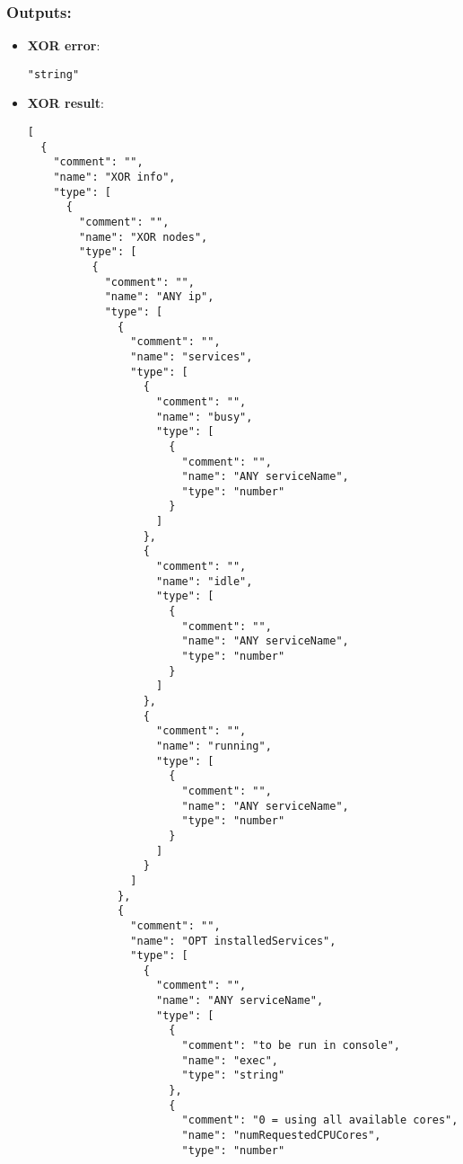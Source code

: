 \subsubsection*{Outputs:}
\begin{itemize}
    \item \textbf{XOR error}: 
\begin{lstlisting}
"string"
\end{lstlisting}
    \item \textbf{XOR result}: 
\begin{lstlisting}
[
  {
    "comment": "", 
    "name": "XOR info", 
    "type": [
      {
        "comment": "", 
        "name": "XOR nodes", 
        "type": [
          {
            "comment": "", 
            "name": "ANY ip", 
            "type": [
              {
                "comment": "", 
                "name": "services", 
                "type": [
                  {
                    "comment": "", 
                    "name": "busy", 
                    "type": [
                      {
                        "comment": "", 
                        "name": "ANY serviceName", 
                        "type": "number"
                      }
                    ]
                  }, 
                  {
                    "comment": "", 
                    "name": "idle", 
                    "type": [
                      {
                        "comment": "", 
                        "name": "ANY serviceName", 
                        "type": "number"
                      }
                    ]
                  }, 
                  {
                    "comment": "", 
                    "name": "running", 
                    "type": [
                      {
                        "comment": "", 
                        "name": "ANY serviceName", 
                        "type": "number"
                      }
                    ]
                  }
                ]
              }, 
              {
                "comment": "", 
                "name": "OPT installedServices", 
                "type": [
                  {
                    "comment": "", 
                    "name": "ANY serviceName", 
                    "type": [
                      {
                        "comment": "to be run in console", 
                        "name": "exec", 
                        "type": "string"
                      }, 
                      {
                        "comment": "0 = using all available cores", 
                        "name": "numRequestedCPUCores", 
                        "type": "number"

\end{lstlisting}
\end{itemize}
